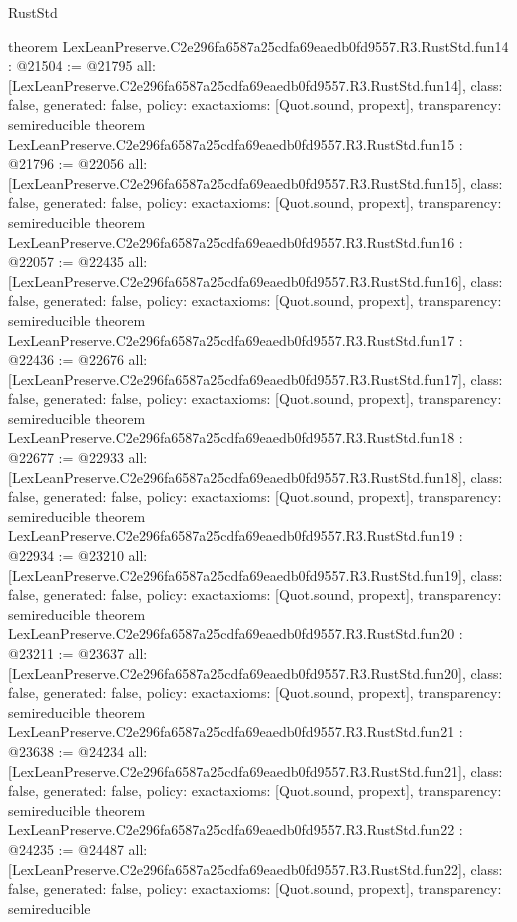\begin{lexlean}{RustStd}
\begin{coremodule}
{}
theorem LexLeanPreserve.C2e296fa6587a25cdfa69eaedb0fd9557.R3.RustStd.fun14 : @21504 := @21795 {
  all: [LexLeanPreserve.C2e296fa6587a25cdfa69eaedb0fd9557.R3.RustStd.fun14],
  class: false,
  generated: false,
  policy: exact{axioms: [Quot.sound, propext]},
  transparency: semireducible
}
theorem LexLeanPreserve.C2e296fa6587a25cdfa69eaedb0fd9557.R3.RustStd.fun15 : @21796 := @22056 {
  all: [LexLeanPreserve.C2e296fa6587a25cdfa69eaedb0fd9557.R3.RustStd.fun15],
  class: false,
  generated: false,
  policy: exact{axioms: [Quot.sound, propext]},
  transparency: semireducible
}
theorem LexLeanPreserve.C2e296fa6587a25cdfa69eaedb0fd9557.R3.RustStd.fun16 : @22057 := @22435 {
  all: [LexLeanPreserve.C2e296fa6587a25cdfa69eaedb0fd9557.R3.RustStd.fun16],
  class: false,
  generated: false,
  policy: exact{axioms: [Quot.sound, propext]},
  transparency: semireducible
}
theorem LexLeanPreserve.C2e296fa6587a25cdfa69eaedb0fd9557.R3.RustStd.fun17 : @22436 := @22676 {
  all: [LexLeanPreserve.C2e296fa6587a25cdfa69eaedb0fd9557.R3.RustStd.fun17],
  class: false,
  generated: false,
  policy: exact{axioms: [Quot.sound, propext]},
  transparency: semireducible
}
theorem LexLeanPreserve.C2e296fa6587a25cdfa69eaedb0fd9557.R3.RustStd.fun18 : @22677 := @22933 {
  all: [LexLeanPreserve.C2e296fa6587a25cdfa69eaedb0fd9557.R3.RustStd.fun18],
  class: false,
  generated: false,
  policy: exact{axioms: [Quot.sound, propext]},
  transparency: semireducible
}
theorem LexLeanPreserve.C2e296fa6587a25cdfa69eaedb0fd9557.R3.RustStd.fun19 : @22934 := @23210 {
  all: [LexLeanPreserve.C2e296fa6587a25cdfa69eaedb0fd9557.R3.RustStd.fun19],
  class: false,
  generated: false,
  policy: exact{axioms: [Quot.sound, propext]},
  transparency: semireducible
}
theorem LexLeanPreserve.C2e296fa6587a25cdfa69eaedb0fd9557.R3.RustStd.fun20 : @23211 := @23637 {
  all: [LexLeanPreserve.C2e296fa6587a25cdfa69eaedb0fd9557.R3.RustStd.fun20],
  class: false,
  generated: false,
  policy: exact{axioms: [Quot.sound, propext]},
  transparency: semireducible
}
theorem LexLeanPreserve.C2e296fa6587a25cdfa69eaedb0fd9557.R3.RustStd.fun21 : @23638 := @24234 {
  all: [LexLeanPreserve.C2e296fa6587a25cdfa69eaedb0fd9557.R3.RustStd.fun21],
  class: false,
  generated: false,
  policy: exact{axioms: [Quot.sound, propext]},
  transparency: semireducible
}
theorem LexLeanPreserve.C2e296fa6587a25cdfa69eaedb0fd9557.R3.RustStd.fun22 : @24235 := @24487 {
  all: [LexLeanPreserve.C2e296fa6587a25cdfa69eaedb0fd9557.R3.RustStd.fun22],
  class: false,
  generated: false,
  policy: exact{axioms: [Quot.sound, propext]},
  transparency: semireducible
}
\end{coremodule}
\end{lexlean}
